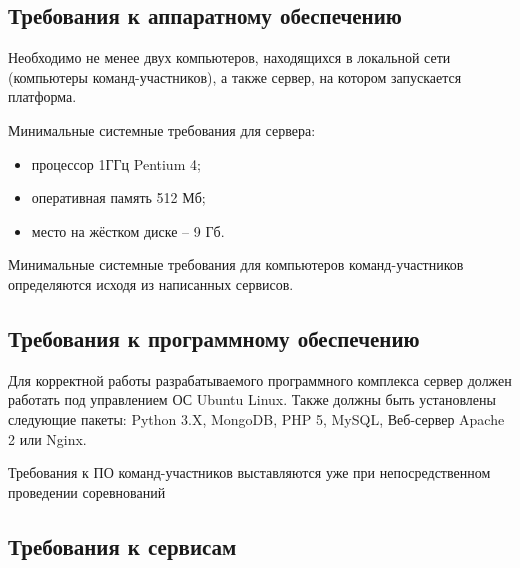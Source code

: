 \subsection {Требования к аппаратному обеспечению}

Необходимо не менее двух компьютеров, находящихся в локальной сети (компьютеры команд-участников), а также сервер, на котором запускается платформа.

Минимальные системные требования для сервера:

\begin{itemize}
\item процессор 1ГГц Pentium 4;
\item оперативная память 512 Мб;
\item место на жёстком диске -- 9 Гб.
\end{itemize}

Минимальные системные требования для компьютеров команд-участников определяются исходя из написанных сервисов.

\subsection {Требования к программному обеспечению}
Для корректной работы разрабатываемого программного комплекса сервер должен работать под управлением ОС Ubuntu Linux. 
Также должны быть установлены следующие пакеты: Python 3.X, MongoDB, PHP 5, MySQL, Веб-сервер Apache 2 или Nginx.


Требования к ПО команд-участников выставляются уже при непосредственном проведении соревнований

\subsection {Требования к сервисам}